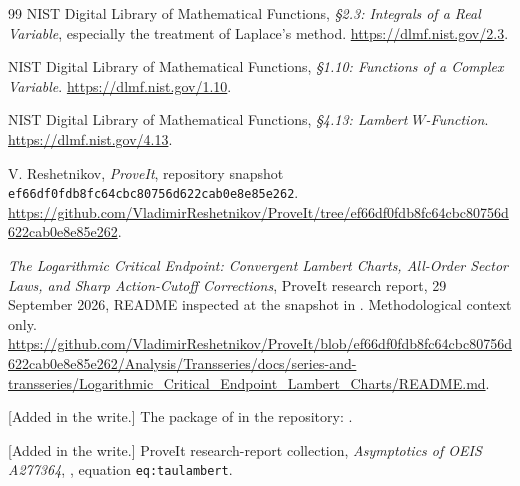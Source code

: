 \documentclass[11pt]{article}
\theoremstyle{definition}
\theoremstyle{remark}
\begin{document}
\begin{thebibliography}{99}
NIST Digital Library of Mathematical Functions,
\emph{\S2.3: Integrals of a Real Variable}, especially the treatment of
Laplace's method. \url{https://dlmf.nist.gov/2.3}.

NIST Digital Library of Mathematical Functions,
\emph{\S1.10: Functions of a Complex Variable}.
\url{https://dlmf.nist.gov/1.10}.

NIST Digital Library of Mathematical Functions,
\emph{\S4.13: Lambert $W$-Function}.
\url{https://dlmf.nist.gov/4.13}.

V. Reshetnikov, \emph{ProveIt}, repository snapshot
\texttt{ef66df0fdb8fc64cbc80756d622cab0e8e85e262}.
\url{https://github.com/VladimirReshetnikov/ProveIt/tree/ef66df0fdb8fc64cbc80756d622cab0e8e85e262}.

\emph{The Logarithmic Critical Endpoint: Convergent Lambert Charts,
All-Order Sector Laws, and Sharp Action-Cutoff Corrections},
ProveIt research report, 29 September 2026, README inspected at the
snapshot in \cite{repo}.  Methodological context only.
\url{https://github.com/VladimirReshetnikov/ProveIt/blob/ef66df0fdb8fc64cbc80756d622cab0e8e85e262/Analysis/Transseries/docs/series-and-transseries/Logarithmic_Critical_Endpoint_Lambert_Charts/README.md}.

[Added in the write.] The package of \cite{repochart} in the repository:
.

[Added in the write.] ProveIt research-report collection,
\emph{Asymptotics of OEIS A277364},
,
equation \texttt{eq:taulambert}.

\end{thebibliography}
\end{document}
